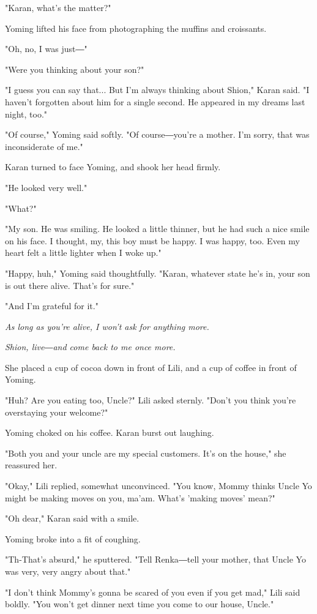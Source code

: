"Karan, what's the matter?"

Yoming lifted his face from photographing the muffins and croissants.

"Oh, no, I was just―"

"Were you thinking about your son?"

"I guess you can say that... But I'm always thinking about Shion," Karan
said. "I haven't forgotten about him for a single second. He appeared in
my dreams last night, too."

"Of course," Yoming said softly. "Of course―you're a mother. I'm sorry,
that was inconsiderate of me."

Karan turned to face Yoming, and shook her head firmly.

"He looked very well."

"What?"

"My son. He was smiling. He looked a little thinner, but he had such a
nice smile on his face. I thought, my, this boy must be happy. I was
happy, too. Even my heart felt a little lighter when I woke up."

"Happy, huh," Yoming said thoughtfully. "Karan, whatever state he's in,
your son is out there alive. That's for sure."

"And I'm grateful for it."

\emph{As long as you're alive, I won't ask for anything more.}

\emph{Shion, live―and come back to me once more.}

She placed a cup of cocoa down in front of Lili, and a cup of coffee in
front of Yoming.

"Huh? Are you eating too, Uncle?" Lili asked sternly. "Don't you think
you're overstaying your welcome?"

Yoming choked on his coffee. Karan burst out laughing.

"Both you and your uncle are my special customers. It's on the house,"
she reassured her.

"Okay," Lili replied, somewhat unconvinced. "You know, Mommy thinks
Uncle Yo might be making moves on you, ma'am. What's 'making moves'
mean?"

"Oh dear," Karan said with a smile.

Yoming broke into a fit of coughing.

"Th-That's absurd," he sputtered. "Tell Renka―tell your mother, that
Uncle Yo was very, very angry about that."

"I don't think Mommy's gonna be scared of you even if you get mad," Lili
said boldly. "You won't get dinner next time you come to our house,
Uncle."

